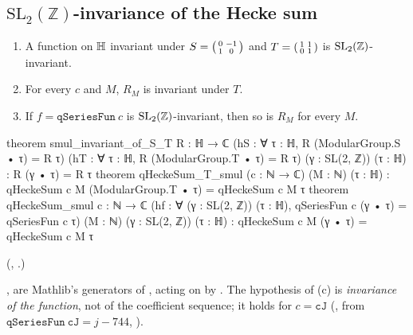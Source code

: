 \subsection{\texorpdfstring{$\mathrm{SL}_2(\mathbb Z)$}{SL2(Z)}-invariance of the Hecke sum}

\begin{theorem}[Invariance of $R_M$]\label{ch19:thm:heckeinv}
\begin{enumerate}[label=(\alph*)]
\item A function on $\mathbb{H}$ invariant under $S=\left(\begin{smallmatrix}0&-1\\1&0\end{smallmatrix}\right)$ and $T=\left(\begin{smallmatrix}1&1\\0&1\end{smallmatrix}\right)$ is
  $\mathrm{SL}_2(\mathbb{Z})$-invariant.
\item For every $c$ and $M$, $R_M$ is invariant under $T$.
\item If $f=\mathtt{qSeriesFun}\ c$ is $\mathrm{SL}_2(\mathbb{Z})$-invariant, then so is $R_M$ for every $M$.
\end{enumerate}
\end{theorem}
\begin{leancode}
theorem smul_invariant_of_S_T {R : ℍ → ℂ} (hS : ∀ τ : ℍ, R (ModularGroup.S • τ) = R τ)
    (hT : ∀ τ : ℍ, R (ModularGroup.T • τ) = R τ) (γ : SL(2, ℤ)) (τ : ℍ) : R (γ • τ) = R τ
theorem qHeckeSum_T_smul (c : ℕ → ℂ) (M : ℕ) (τ : ℍ) :
    qHeckeSum c M (ModularGroup.T • τ) = qHeckeSum c M τ
theorem qHeckeSum_smul {c : ℕ → ℂ}
    (hf : ∀ (γ : SL(2, ℤ)) (τ : ℍ), qSeriesFun c (γ • τ) = qSeriesFun c τ) (M : ℕ)
    (γ : SL(2, ℤ)) (τ : ℍ) : qHeckeSum c M (γ • τ) = qHeckeSum c M τ
\end{leancode}
(, .)
\begin{dictionary}
,  are Mathlib's generators of , acting on  by
.  The hypothesis of (c) is \emph{invariance of the function}, not of the coefficient sequence; it holds for
$c=\mathtt{cJ}$ (, from $\mathtt{qSeriesFun}\ \mathtt{cJ}=j-744$, ).
\end{dictionary}
